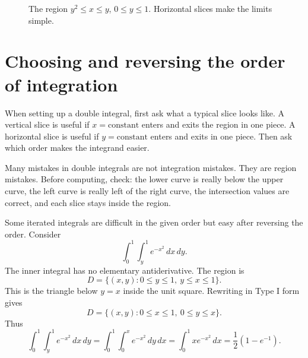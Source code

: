 \documentclass[11pt]{article}
\begin{document}
\begin{figure}[H]
\centering
{}
\caption{The region $y^2\le x\le y$, $0\le y\le 1$. Horizontal slices make the limits simple.}
\end{figure}

\section{Choosing and reversing the order of integration}

When setting up a double integral, first ask what a typical slice looks like. A vertical slice is useful if $x=\text{constant}$ enters and exits the region in one piece. A horizontal slice is useful if $y=\text{constant}$ enters and exits in one piece. Then ask which order makes the integrand easier.

\begin{notebox}
Many mistakes in double integrals are not integration mistakes. They are region mistakes. Before computing, check: the lower curve is really below the upper curve, the left curve is really left of the right curve, the intersection values are correct, and each slice stays inside the region.
\end{notebox}

Some iterated integrals are difficult in the given order but easy after reversing the order. Consider
\[
\int_0^1\int_y^1 e^{-x^2}\,dx\,dy.
\]
The inner integral has no elementary antiderivative. The region is
\[
D=\{(x,y):0\le y\le 1,\ y\le x\le 1\}.
\]
This is the triangle below $y=x$ inside the unit square. Rewriting in Type I form gives
\[
D=\{(x,y):0\le x\le 1,\ 0\le y\le x\}.
\]
Thus
\[
\int_0^1\int_y^1 e^{-x^2}\,dx\,dy
=\int_0^1\int_0^x e^{-x^2}\,dy\,dx
=\int_0^1 x e^{-x^2}\,dx
=\frac12(1-e^{-1}).
\]
\end{document}
